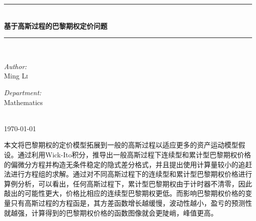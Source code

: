 \documentclass{ctexart} %
\begin{document}

\begin{titlepage}

\newcommand{\HRule}{\rule{\linewidth}{0.5mm}} %

\center %

\HRule \\[0.4cm]
{ \huge \bfseries 基于高斯过程的巴黎期权定价问题}\\[0.4cm] %
\HRule \\[1.5cm]

\begin{minipage}{0.4\textwidth}
\begin{flushleft} \large
\emph{Author:}\\
Ming \textsc{Li} %
\end{flushleft}
\end{minipage}
\begin{minipage}{0.4\textwidth}
\begin{flushright} \large
\emph{Department:} \\
Mathematics
\end{flushright}
\end{minipage}\\[4cm]

{\large \today}\\[3cm] %


\vfill %
\end{titlepage}
\newpage
本文将巴黎期权的定价模型拓展到一般的高斯过程以适应更多的资产运动模型假设。通过利用Wick-Ito积分，推导出一般高斯过程下连续型和累计型巴黎期权价格的偏微分方程并构造无条件稳定的隐式差分格式，并且提出使用计算量较小的追赶法进行方程组的求解。通过对不同高斯过程下的连续型和累计型巴黎期权价格进行算例分析，可以看出，任何高斯过程下，累计型巴黎期权由于计时器不清零，因此敲出的可能性更大，价格比相应的连续型巴黎期权更低。而影响巴黎期权价格的变量只有高斯过程的方程函是，其方差函数增长越缓慢，波动性越小，盈亏的预测性就越强，计算得到的巴黎期权价格的函数图像就会更陡峭，峰值更高。
\end{document}
